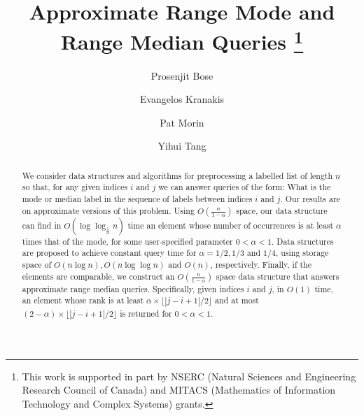 \documentclass{llncs}
\date{}
\begin{document}
\title{Approximate Range Mode and Range Median Queries
\thanks{This work is supported in part by NSERC (Natural Sciences and 
Engineering Research Council of Canada) and MITACS (Mathematics of Information 
Technology and Complex Systems) grants.}}

\author{Prosenjit Bose \and 
Evangelos Kranakis\and 
Pat Morin\and 
Yihui Tang}


\maketitle

\begin{abstract}
We consider data structures and algorithms for preprocessing a labelled 
list of length $n$ so that, for any given indices $i$ and $j$ we can answer 
queries of the form: What is the mode or median label in the sequence 
of labels between indices $i$ and $j$. Our results are on approximate 
versions of this problem. Using $O(\frac{n}{1-\alpha})$ space, our data 
structure can find in $O(\log\log_{\frac{1}{\alpha}}n)$ time an 
element whose number of occurrences is at least $\alpha$ times 
that of the mode, for some user-specified parameter $0<\alpha<1$. 
Data structures are proposed to achieve constant query time 
for $\alpha = 1/2, 1/3 \mbox{ and } 1/4$, using storage space of
$O(n\log n), O(n\log\log n)$ and $O(n)$, respectively.
Finally, if the elements are comparable, we construct an
$O(\frac{n}{1-\alpha})$ space data structure that answers approximate range
median queries. Specifically, given indices $i$ and $j$, in $O(1)$
time, an element whose rank is at least $\alpha \times \lfloor
|j-i+1|/2\rfloor$ and at most $(2-\alpha) \times \lfloor
|j-i+1|/2\rfloor$ is returned for $0 <\alpha<1$.
\end{abstract}
\end{document}
